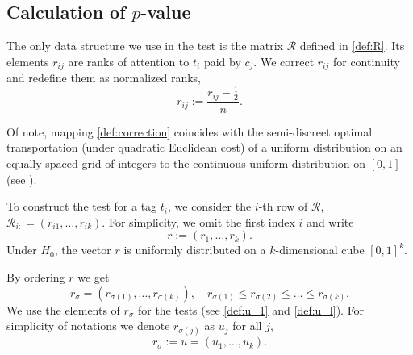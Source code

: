 \documentclass{llncs}
\begin{document}
\subsection{Calculation of $p$-value}
\label{sec:theory}
The only data structure we use in the test is the matrix $\mathcal{R}$ defined in \eqref{def:R}.  
Its elements $r_{ij}$ are ranks of attention to $t_i$ paid by $c_j$.
We correct $r_{ij}$ for continuity and redefine them as normalized ranks,
\begin{equation}
\label{def:correction}
r_{ij} := \frac{r_{ij} - \frac{1}{2}}{n}.
\end{equation}

Of note, mapping \eqref{def:correction} coincides with the semi-discreet optimal transportation (under quadratic Euclidean cost) of a uniform distribution on an equally-spaced grid of integers to the continuous uniform distribution on $[0, 1]$ (see \cite{Solomon2018OptimalTO}).

To construct the test for a tag $t_i$, we consider the $i$-th row of $\mathcal{R}$, $\mathcal{R}_{i:} = (r_{i1}, \dots, r_{ik})$. For simplicity, we omit the first index $i$ and write
\[
r := (r_{1}, \dots, r_{k}).
\]
Under $H_0$, the vector $r$ is uniformly distributed on a $k$-dimensional cube $[0, 1]^{k}$.

By ordering $r$ we get
\[
r_{\sigma} = (r_{\sigma(1)}, \dots, r_{\sigma(k)}), 
\quad
r_{\sigma(1)} \leq r_{\sigma(2)} \leq \dots \leq r_{\sigma(k)}.
\]
We use the elements of $r_{\sigma}$ for the tests (see \eqref{def:u_1} and \eqref{def:u_l}). For simplicity of notations we denote $r_{\sigma(j)}$ as $u_j$ for all $j$,
\begin{equation}
\label{def:u}
    r_{\sigma} := u = (u_1, \dots, u_k).
\end{equation}
\end{document}
